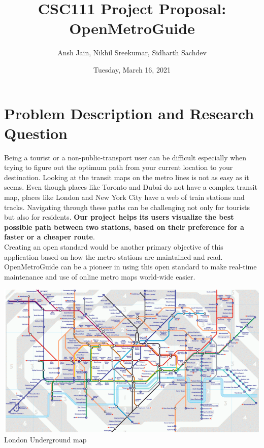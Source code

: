 \documentclass[fontsize=11pt]{article}
\title{CSC111 Project Proposal: OpenMetroGuide}
\author{Ansh Jain, Nikhil Sreekumar, Sidharth Sachdev}
\date{Tuesday, March 16, 2021}
\begin{document}
\maketitle

\section*{Problem Description and Research Question}

Being a tourist or a non-public-transport user can be difficult especially when trying to figure out the optimum path from your current location to your destination. Looking at the transit maps on the metro lines is not as easy as it seems. Even though places like Toronto and Dubai do not have a complex transit map, places like London and New York City have a web of train stations and tracks. Navigating through these paths can be challenging not only for tourists but also for residents. \textbf{Our project helps its users visualize the best possible path between two stations, based on their preference for a faster or a cheaper route}. \\
Creating an open standard would be another primary objective of this application based on how the metro stations are maintained and read. OpenMetroGuide can be a pioneer in using this open standard to make real-time maintenance and use of online metro maps world-wide easier.
\begin{center}
\includegraphics[width = 15cm]{London Transit Map.png}\\
\caption{London Underground map}
\end{center}
\end{document}

